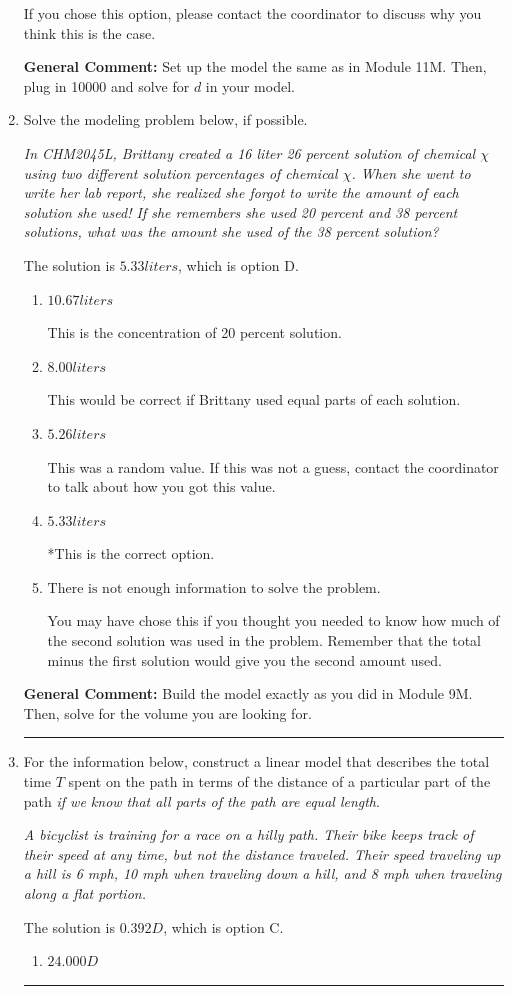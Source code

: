 \documentclass{extbook}[14pt]
\newcommand{\litem}[1]{\item #1

\rule{\textwidth}{0.4pt}}
\begin{document}
\begin{enumerate}
{\begin{enumerate}[label=\Alph*.]
If you chose this option, please contact the coordinator to discuss why you think this is the case.
\end{enumerate}

\textbf{General Comment:} Set up the model the same as in Module 11M. Then, plug in 10000 and solve for $d$ in your model.
}
\litem{
Solve the modeling problem below, if possible.

\begin{center}
    \textit{ In CHM2045L, Brittany created a 16 liter 26 percent solution of chemical $\chi$ using two different solution percentages of chemical $\chi$. When she went to write her lab report, she realized she forgot to write the amount of each solution she used! If she remembers she used 20 percent and 38 percent solutions, what was the amount she used of the 38 percent solution? }
\end{center}
The solution is \( 5.33 liters \), which is option D.\begin{enumerate}[label=\Alph*.]
\item \( 10.67 liters \)

This is the concentration of 20 percent solution.
\item \( 8.00 liters \)

This would be correct if Brittany used equal parts of each solution.
\item \( 5.26 liters \)

This was a random value. If this was not a guess, contact the coordinator to talk about how you got this value.
\item \( 5.33 liters \)

*This is the correct option.
\item \( \text{There is not enough information to solve the problem.} \)

You may have chose this if you thought you needed to know how much of the second solution was used in the problem. Remember that the total minus the first solution would give you the second amount used.
\end{enumerate}

\textbf{General Comment:} Build the model exactly as you did in Module 9M. Then, solve for the volume you are looking for.
}
\litem{
For the information below, construct a linear model that describes the total time $T$ spent on the path in terms of the distance of a particular part of the path \textit{if we know that all parts of the path are equal length}.

\begin{center}
    \textit{ A bicyclist is training for a race on a hilly path. Their bike keeps track of their speed at any time, but not the distance traveled. Their speed traveling up a hill is 6 mph, 10 mph when traveling down a hill, and 8 mph when traveling along a flat portion. }
\end{center}
The solution is \( 0.392 D \), which is option C.\begin{enumerate}[label=\Alph*.]
\item \( 24.000 D \)


\end{enumerate}}
\end{enumerate}
\end{document}
